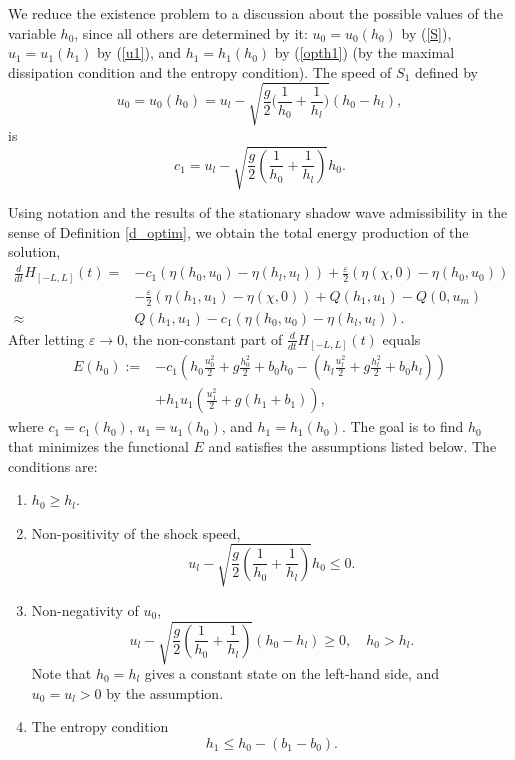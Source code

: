 \documentclass{article}
\theoremstyle{plain}
\theoremstyle{definition}
\theoremstyle{remark}
\begin{document}
We reduce the existence problem to a discussion about the possible values of 
the variable $h_{0}$, since all others are determined by it: 
$u_{0}=u_{0}(h_{0})$ by (\ref{S}), $u_{1}=u_{1}(h_{1})$ by (\ref{u1}), 
and 
$h_{1}=h_{1}(h_{0})$ by (\ref{opth1})
(by the maximal dissipation condition and the entropy condition).
The speed of $S_{1}$ defined by 
\begin{equation}\label{u01}
u_0=u_0(h_0)=u_l-\sqrt{\frac{g}{2}\Big(\frac{1}{h_0}+\frac{1}{h_l}\Big)}(h_0-h_l),
\end{equation}
is 
\[
c_{1} = u_{l} - \sqrt{\frac{g}{2}
\left( \frac{1}{h_{0}} + \frac{1}{h_{l}} \right)} h_{0}. 
\]

Using notation and the results of the 
stationary shadow wave admissibility 
in the sense of Definition \ref{d_optim},  we obtain the total energy production of the solution,
\[
\begin{split}
\frac{d}{dt}H_{[-L,L]}(t) = & -c_{1} \left(\eta(h_{0},u_{0}) 
- \eta(h_{l},u_{l})\right)
+ \frac{\varepsilon}{2}\left(\eta(\chi,0) 
-\eta(h_{0},u_{0})\right) \\
& - \frac{\varepsilon}{2}\left( \eta(h_{1},u_{1}) 
-\eta(\chi,0) \right) 
+Q(h_{1},u_{1})-Q(0,u_{m}) \\
\approx &  Q(h_{1},u_{1}) 
-c_{1} \left(\eta(h_{0},u_{0}) - \eta(h_{l},u_{l})\right). 
\end{split}
\]
After letting $\varepsilon \to 0$, the non-constant part of 
$\frac{d}{dt}H_{[-L,L]}(t)$ equals
\begin{equation}\label{E}
\begin{split}
E(h_0):= & -c_{1}
\left( h_{0}\frac{u_{0}^{2}}{2}+g\frac{h_{0}^{2}}{2}+b_{0}h_{0}
-\left( h_{l}\frac{u_{l}^{2}}{2}+g\frac{h_{l}^{2}}{2}+b_{0}h_{l}\right)
\right)\\
& + h_{1}u_{1}\left( \frac{u_{1}^{2}}{2}+g(h_{1}+b_{1})\right),	
\end{split}
\end{equation}
where $c_{1}=c_{1}(h_{0})$, $u_{1}=u_{1}(h_{0})$, and $h_{1}=h_{1}(h_{0})$.
The goal is to find $h_{0}$ that minimizes the functional $E$ and satisfies
the assumptions listed below.
The conditions are:
\begin{enumerate}
\item $h_{0}\geq h_{l}$.
\item Non-positivity of the shock speed,
\begin{equation} \label{C1}
u_{l} - \sqrt{\frac{g}{2} \left( \frac{1}{h_{0}} + \frac{1}{h_{l}} \right)}
h_{0}\leq 0.
\end{equation}
\item Non-negativity of $u_{0}$,  
\begin{equation} \label{C2}
u_{l} - \sqrt{\frac{g}{2} \left( \frac{1}{h_{0}} + \frac{1}{h_{l}} \right)}
\left( h_{0} - h_{l} \right) \geq 0, \quad h_{0} > h_{l}.
\end{equation}
Note that $h_{0}=h_{l}$ gives a constant state on the left-hand side,
and $u_{0}=u_{l}>0$ by the assumption.
\item  The entropy condition
\[h_1\leq h_0-(b_1-b_0).\]
\end{enumerate}
\end{document}
